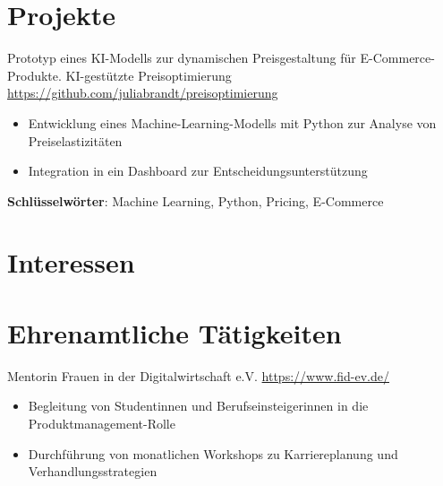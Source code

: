 \documentclass[a4paper, serif, 10pt]{moderncv}
\begin{document}
\section{Projekte}

        {Prototyp eines KI-Modells zur dynamischen Preisgestaltung für E-Commerce-Produkte.}
        {KI-gestützte Preisoptimierung}
        {\url{https://github.com/juliabrandt/preisoptimierung}}
        {}
        {\begin{itemize}
\item Entwicklung eines Machine-Learning-Modells mit Python zur Analyse von Preiselastizitäten
\item Integration in ein Dashboard zur Entscheidungsunterstützung
\end{itemize}
\textbf{Schlüsselwörter}: Machine Learning, Python, Pricing, E-Commerce}
\section{Interessen}

\section{Ehrenamtliche Tätigkeiten}

        {Mentorin}
        {Frauen in der Digitalwirtschaft e.V.}
        {\url{https://www.fid-ev.de/}}
        {}
        {\begin{itemize}
\item Begleitung von Studentinnen und Berufseinsteigerinnen in die Produktmanagement-Rolle
\item Durchführung von monatlichen Workshops zu Karriereplanung und Verhandlungsstrategien
\end{itemize}}
    
\end{document}
